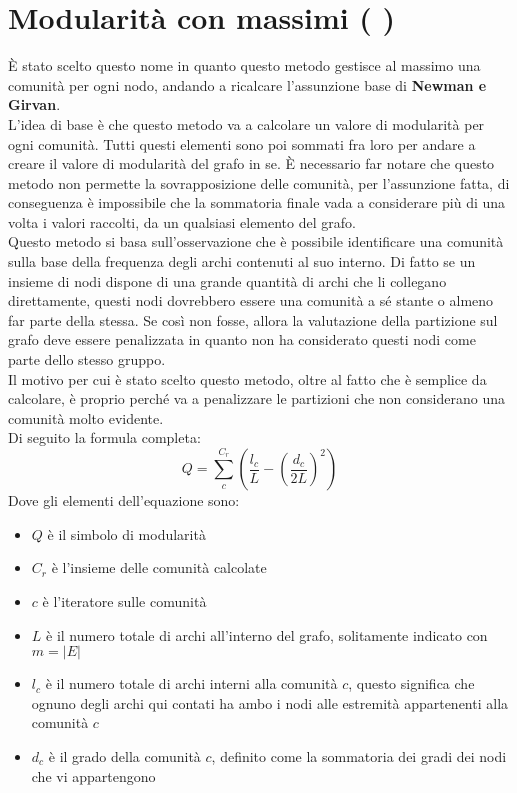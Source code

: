 \section{Modularità con massimi ( \mmax )}
È stato scelto questo nome in quanto questo metodo gestisce al massimo una comunità per ogni nodo, andando a ricalcare l'assunzione base di \textbf{Newman e Girvan}.\\
L'idea di base è che questo metodo va a calcolare un valore di modularità per ogni comunità. Tutti questi elementi sono poi sommati fra loro per andare a creare il valore di modularità del grafo in se. È necessario far notare che questo metodo non permette la sovrapposizione delle comunità, per l'assunzione fatta, di conseguenza è impossibile che la sommatoria finale vada a considerare più di una volta i valori raccolti, da un qualsiasi elemento del grafo.\\
Questo metodo si basa sull'osservazione che è possibile identificare una comunità sulla base della frequenza degli archi contenuti al suo interno. Di fatto se un insieme di nodi dispone di una grande quantità di archi che li collegano direttamente, questi nodi dovrebbero essere una comunità a sé stante o almeno far parte della stessa. Se così non fosse, allora la valutazione della partizione sul grafo deve essere penalizzata in quanto non ha considerato questi nodi come parte dello stesso gruppo.\\
Il motivo per cui è stato scelto questo metodo, oltre al fatto che è semplice da calcolare, è proprio perché va a penalizzare le partizioni che non considerano una comunità molto evidente.\\
Di seguito la formula completa:
\begin{equation}
	Q=\sum_{c}^{C_r} \left( \frac{l_c}{L}-\left(\frac{d_c}{2L} \right)^2 \right)
	\label{eq:m_max}
\end{equation}
Dove gli elementi dell'equazione sono:
\begin{itemize}
	\item $Q$ è il simbolo di modularità
	\item $C_r$ è l'insieme delle comunità calcolate
	\item $c$ è l'iteratore sulle comunità
	\item $L$ è il numero totale di archi all'interno del grafo, solitamente indicato con $m=|E|$
	\item $l_c$ è il numero totale di archi interni alla comunità $c$, questo significa che ognuno degli archi qui contati ha ambo i nodi alle estremità appartenenti alla comunità $c$
	\item $d_c$ è il grado della comunità $c$, definito come la sommatoria dei gradi dei nodi che vi appartengono
\end{itemize}
